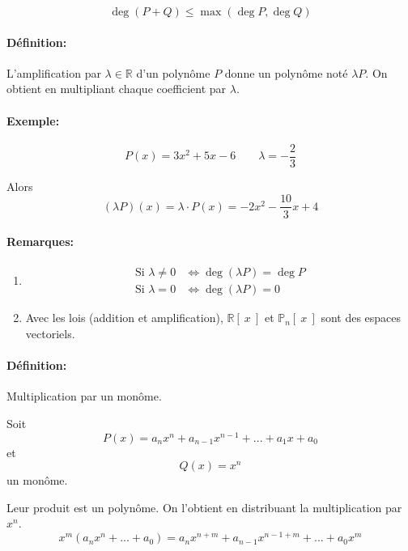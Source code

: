 \documentclass[
    11pt,
    a4paper,
    oneside,
    headinlcude, footinclude,
    twoside,
]{report}
\begin{document}
$$\deg (P+Q) \leq \max(\deg P, \deg Q)$$

\paragraph{Définition:}

L'amplification par $\lambda \in \mathbb{R}$ d'un polynôme $P$ donne un
polynôme noté $\lambda P$. On obtient en multipliant chaque coefficient par $\lambda$.

\paragraph{Exemple:}

$$P(x) = 3x^{2}+5x-6\quad \quad \lambda = -\frac{2}{3}$$

Alors $$(\lambda P)(x) = \lambda \cdot P(x) = -2x^{2} - \frac{10}{3}x + 4$$

\paragraph{Remarques:}

\begin{enumerate}

    \item 
        \[
            \begin{split}
                \text{Si } \lambda \neq 0 & \iff \deg(\lambda P) = \deg P\\
                \text{Si } \lambda = 0 & \iff \deg(\lambda P) = 0
            \end{split}
        \]

    \item Avec les lois (addition et amplification), $\mathbb{R}[\ x\ ]$ et
        $\mathbb{P}_{n}[\ x\ ]$ sont des espaces vectoriels.
\end{enumerate}



\paragraph{Définition:}

Multiplication par un monôme.

Soit $$P(x) = a_{n}x^{n} + a_{n-1}x^{n-1} + ... + a_{1}x + a_{0}$$ et $$Q(x) =
x^{n}$$
un monôme.

Leur produit est un polynôme. On l'obtient en distribuant la multiplication par
$x^{n}$.
$$x^{m}(a_{n}x^{n} + ...+ a_{0}) = a_{n}x^{n+m} + a_{n-1}x^{n-1+m} + ... +
a_{0}x^{m}$$
\end{document}
